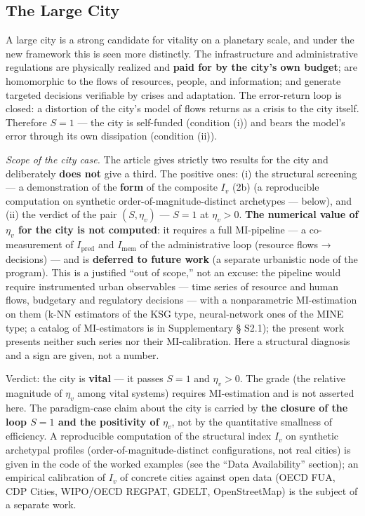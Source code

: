 \documentclass[pdflatex,sn-mathphys-ay]{sn-jnl}
\begin{document}
\subsection{The Large City}\label{the-large-city}

A large city is a strong candidate for vitality on a planetary scale, and under the new framework this is seen more distinctly. The infrastructure and administrative regulations are physically realized and \textbf{paid for by the city's own budget}; are homomorphic to the flows of resources, people, and information; and generate targeted decisions verifiable by crises and adaptation. The error-return loop is closed: a distortion of the city's model of flows returns as a crisis to the city itself. Therefore \(S = 1\) --- the city is self-funded (condition (i)) and bears the model's error through its own dissipation (condition (ii)).

\emph{Scope of the city case.} The article gives strictly two results for the city and deliberately \textbf{does not} give a third. The positive ones: (i) the structural screening --- a demonstration of the \textbf{form} of the composite \(I_v\) (2b) (a reproducible computation on synthetic order-of-magnitude-distinct archetypes --- below), and (ii) the verdict of the pair \((S, \eta_v)\) --- \(S = 1\) at \(\eta_v > 0\). \textbf{The numerical value of \(\eta_v\) for the city is not computed}: it requires a full MI-pipeline --- a co-measurement of \(I_{\text{pred}}\) and \(I_{\text{mem}}\) of the administrative loop (resource flows → decisions) --- and is \textbf{deferred to future work} (a separate urbanistic node of the program). This is a justified ``out of scope,'' not an excuse: the pipeline would require instrumented urban observables --- time series of resource and human flows, budgetary and regulatory decisions --- with a nonparametric MI-estimation on them (k-NN estimators of the KSG type, neural-network ones of the MINE type; a catalog of MI-estimators is in Supplementary § S2.1); the present work presents neither such series nor their MI-calibration. Here a structural diagnosis and a sign are given, not a number.

Verdict: the city is \textbf{vital} --- it passes \(S = 1\) and \(\eta_v > 0\). The grade (the relative magnitude of \(\eta_v\) among vital systems) requires MI-estimation and is not asserted here. The paradigm-case claim about the city is carried by \textbf{the closure of the loop \(S = 1\) and the positivity of \(\eta_v\)}, not by the quantitative smallness of efficiency. A reproducible computation of the structural index \(I_v\) on synthetic archetypal profiles (order-of-magnitude-distinct configurations, not real cities) is given in the code of the worked examples (see the ``Data Availability'' section); an empirical calibration of \(I_v\) of concrete cities against open data (OECD FUA, CDP Cities, WIPO/OECD REGPAT, GDELT, OpenStreetMap) is the subject of a separate work.
\end{document}
